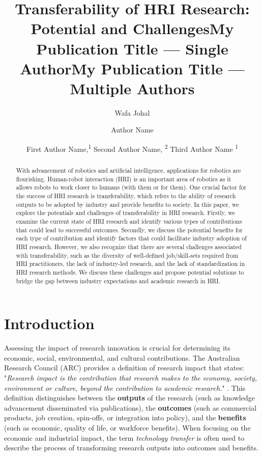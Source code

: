 \documentclass[letterpaper]{article} %
\title{Transferability of HRI Research: Potential and Challenges}
\author{
    Wafa Johal
}
\title{My Publication Title --- Single Author}
\author {
    Author Name
}
\title{My Publication Title --- Multiple Authors}
\author {
    First Author Name,\textsuperscript{\rm 1}
    Second Author Name, \textsuperscript{\rm 2}
    Third Author Name \textsuperscript{\rm 1}
}
\begin{document}
\maketitle

\begin{abstract}
With advancement of robotics and artificial intelligence, applications for robotics are flourishing. Human-robot interaction (HRI) is an important area of robotics as it allows robots to work closer to humans (with them or for them).
One crucial factor for the success of HRI research is transferability, which refers to the ability of research outputs to be adopted by industry and provide benefits to society.
In this paper, we explore the potentials and challenges of transferability in HRI research.
Firstly, we examine the current state of HRI research and identify various types of contributions that could lead to successful outcomes. Secondly, we discuss the potential benefits for each type of contribution and identify factors that could facilitate industry adoption of HRI research.
However, we also recognize that there are several challenges associated with transferability, such as the diversity of well-defined job/skill-sets required from HRI practitioners, the lack of industry-led research, and the lack of standardization in HRI research methods. We discuss these challenges and propose potential solutions to bridge the gap between industry expectations and academic research in HRI.
\end{abstract}


\section{Introduction}
Assessing the impact of research innovation is crucial for determining its economic, social, environmental, and cultural contributions.  The Australian Research Council (ARC) provides a definition of research impact that states: "\textit{Research impact is the contribution that research makes to the economy, society, environment or culture, beyond the contribution to academic research.}" \cite{ARC}.
This definition distinguishes between the \textbf{outputs} of the research (such as knowledge advancement disseminated via publications), the \textbf{outcomes} (such as commercial products, job creation, spin-offs, or integration into policy), and the \textbf{benefits} (such as economic, quality of life, or workforce benefits).
When focusing on the economic and industrial impact, the term \emph{technology transfer} is often used to describe the process of transforming research outputs into outcomes and benefits.
\end{document}
